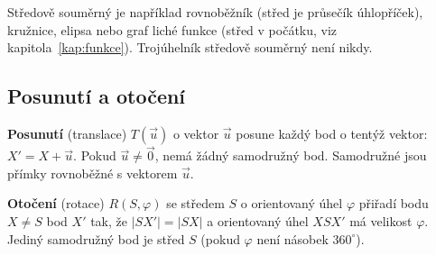 \begin{center}
\end{center}

Středově souměrný je například rovnoběžník (střed je průsečík úhlopříček), kružnice, elipsa nebo graf liché funkce (střed v počátku, viz kapitola~\ref{kap:funkce}). Trojúhelník středově souměrný není nikdy.

\subsection{Posunutí a otočení}\label{sec:posunuti-otoceni}

\begin{definitionbox}
  \textbf{Posunutí} (translace) $T(\vec{u})$ o vektor $\vec{u}$ posune každý bod o tentýž vektor: $X' = X + \vec{u}$. Pokud $\vec{u}\neq\vec{0}$, nemá žádný samodružný bod. Samodružné jsou přímky rovnoběžné s vektorem $\vec{u}$.

  \vspace{0.2cm}

  \textbf{Otočení} (rotace) $R(S, \varphi)$ se středem $S$ o orientovaný úhel $\varphi$ přiřadí bodu $X\neq S$ bod $X'$ tak, že $|SX'| = |SX|$ a orientovaný úhel $XSX'$ má velikost $\varphi$. Jediný samodružný bod je střed $S$ (pokud $\varphi$ není násobek $360^\circ$).
\end{definitionbox}

